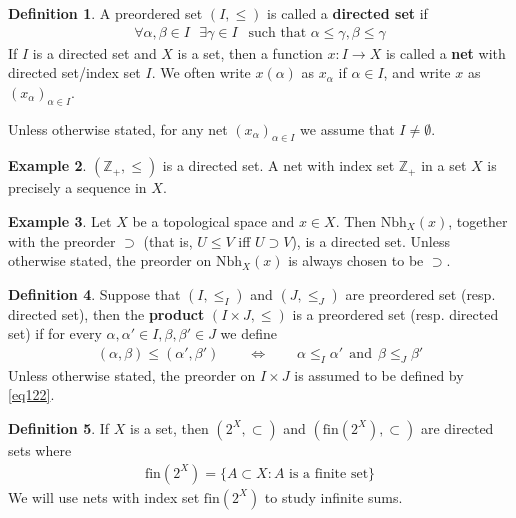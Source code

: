 \documentclass[12pt,b5paper,notitlepage]{article}
\theoremstyle{definition}
\newtheorem{df}{Definition}[subsection]
\newtheorem{eg}[df]{Example}
\theoremstyle{plain}
\newcommand{\Zbb}{\mathbb Z}
\newcommand{\fin}{\mathrm{fin}}
\newcommand{\Nbh}{\mathrm{Nbh}}
\newcommand{\hqed}{\hfill\qedsymbol}
\numberwithin{equation}{section}
\begin{document}
\begin{df}
A preordered set $(I,\leq)$ is called a \textbf{directed set}  if 
\begin{align}
\forall\alpha,\beta\in I~~~\exists\gamma\in I~~\text{ such that }\alpha\leq \gamma,\beta\leq\gamma  \label{eq123}
\end{align}
If $I$ is a directed set and $X$ is a set, then a function $x:I\rightarrow X$ is called a \textbf{net}  with directed set/index set $I$. We often write $x(\alpha)$ as $x_\alpha$ if $\alpha\in I$, and write $x$ as $(x_\alpha)_{\alpha\in I}$.

Unless otherwise stated, for any net $(x_\alpha)_{\alpha\in I}$ we assume that $I\neq\emptyset$.  \hqed
\end{df}


\begin{eg}
$(\Zbb_+,\leq)$ is a directed set. A net with index set $\Zbb_+$ in a set $X$ is precisely a sequence in $X$.
\end{eg}


\begin{eg}
Let $X$ be a topological space and $x\in X$. Then $\Nbh_X(x)$, together with the preorder $\supset$ (that is, $U\leq V$ iff $U\supset V$), is a directed set. Unless otherwise stated, the preorder on $\Nbh_X(x)$ is always chosen to be $\supset$.
\end{eg}

\begin{df}\label{lb207}
Suppose that $(I,\leq_I )$ and $(J,\leq_J)$ are preordered set (resp. directed set), then the \textbf{product}  $(I\times J,\leq)$ is a preordered set (resp. directed set) if for every $\alpha,\alpha'\in I,\beta,\beta'\in J$ we define
\begin{align}\label{eq122}
(\alpha,\beta)\leq (\alpha',\beta')\qquad\Longleftrightarrow\qquad \alpha\leq_I \alpha'~~\text{and}~~\beta\leq_J\beta'
\end{align}
Unless otherwise stated, the preorder on $I\times J$ is assumed to be defined by \eqref{eq122}.
\end{df}


\begin{df}
If $X$ is a set, then $(2^X,\subset)$ and $(\fin(2^X),\subset)$ \index{fin@$\fin(2^X)$} are directed sets where
\begin{align}
\fin(2^X)=\{A\subset X:A\text{ is a finite set}\}
\end{align}
We will use nets with index set $\fin(2^X)$ to study infinite sums.
\end{df}
\end{document}

